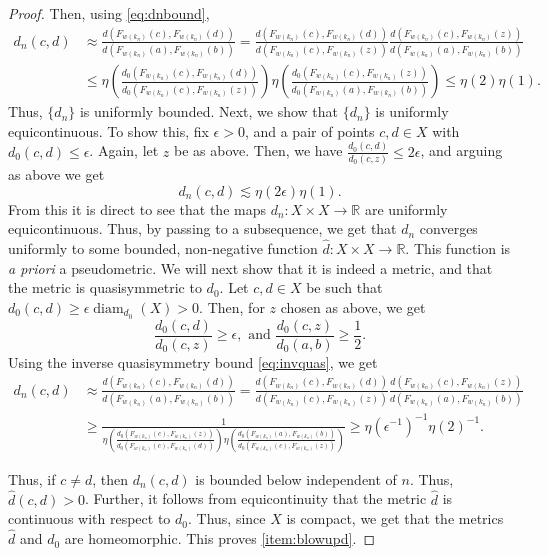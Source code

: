 \documentclass{amsart}
\DeclareMathOperator{\diam}{diam}
\theoremstyle{plain}
\theoremstyle{definition}
\numberwithin{equation}{section}
\numberwithin{theorem}{section}
\newcommand{\RR}{\mathbb{R}}
\begin{document}
\begin{proof}
Then, using \eqref{eq:dnbound},
\begin{align*}
d_n(c,d)&\approx \frac{d(F_{w(k_n)}(c),F_{w(k_n)}(d))}{d(F_{w(k_n)}(a),F_{w(k_n)}(b))}=\frac{d(F_{w(k_n)}(c),F_{w(k_n)}(d))}{d(F_{w(k_n)}(c),F_{w(k_n)}(z))}  \frac{d(F_{w(k_n)}(c),F_{w(k_n)}(z))}{d(F_{w(k_n)}(a),F_{w(k_n)}(b))} \\
&\leq \eta\left(\frac{d_0(F_{w(k_n)}(c),F_{w(k_n)}(d))}{d_0(F_{w(k_n)}(c),F_{w(k_n)}(z))}\right) \eta\left(\frac{d_0(F_{w(k_n)}(c),F_{w(k_n)}(z))}{d_0(F_{w(k_n)}(a),F_{w(k_n)}(b))}\right) \leq \eta(2) \eta(1).
\end{align*}
Thus, $\{d_n\}$ is uniformly bounded. Next, we show that $\{d_n\}$ is uniformly equicontinuous. To show this, fix $\epsilon>0$, and a pair of points $c,d\in X$ with $d_0(c,d)\leq \epsilon$. Again, let $z$ be as above. Then, we have $\frac{d_0(c,d)}{d_0(c,z)}\leq 2 \epsilon$, and arguing as above we get
\[
d_n(c,d)\lesssim \eta(2\epsilon)\eta(1).
\]
From this it is direct to see that the maps $d_n:X\times X\to \RR$ are uniformly equicontinuous. Thus, by passing to a subsequence, we get that $d_n$ converges uniformly to some bounded, non-negative function $
\hat{d}:X\times X\to\RR$. This function is \emph{a priori} a pseudometric. We will next show that it is indeed a metric, and that the metric is quasisymmetric to $d_0$. Let $c,d\in X$ be such that $d_0(c,d)\geq \epsilon \diam_{d_0}(X)>0$. Then, for $z$ chosen as above, we get
\[
\frac{d_0(c,d)}{d_0(c,z)}\geq \epsilon, \text{ and } \frac{d_0(c,z)}{d_0(a,b)}\geq \frac{1}{2}.
\]
Using the inverse quasisymmetry bound \eqref{eq:invquas}, we get
\begin{align*}
d_n(c,d)&\approx\frac{d(F_{w(k_n)}(c),F_{w(k_n)}(d))}{d(F_{w(k_n)}(a),F_{w(k_n)}(b))}=\frac{d(F_{w(k_n)}(c),F_{w(k_n)}(d))}{d(F_{w(k_n)}(c),F_{w(k_n)}(z))}  \frac{d(F_{w(k_n)}(c),F_{w(k_n)}(z))}{d(F_{w(k_n)}(a),F_{w(k_n)}(b))} \\
&\geq \frac{1}{\eta\left(\frac{d_0(F_{w(k_n)}(c),F_{w(k_n)}(z))}{d_0(F_{w(k_n)}(c),F_{w(k_n)}(d))}\right) \eta\left(\frac{d_0(F_{w(k_n)}(a),F_{w(k_n)}(b))}{d_0(F_{w(k_n)}(c),F_{w(k_n)}(z))}\right)} \geq \eta(\epsilon^{-1})^{-1} \eta(2)^{-1}.
\end{align*}

Thus, if $c\neq d$, then $d_n(c,d)$ is bounded below independent of $n$. Thus, $\hat{d}(c,d)>0$. Further, it follows from equicontinuity that the metric $\hat{d}$ is continuous with respect to $d_0$. Thus, since $X$ is compact, we get that the metrics $\hat{d}$ and $d_0$ are homeomorphic. This proves \eqref{item:blowupd}.


\end{proof}
\end{document}
